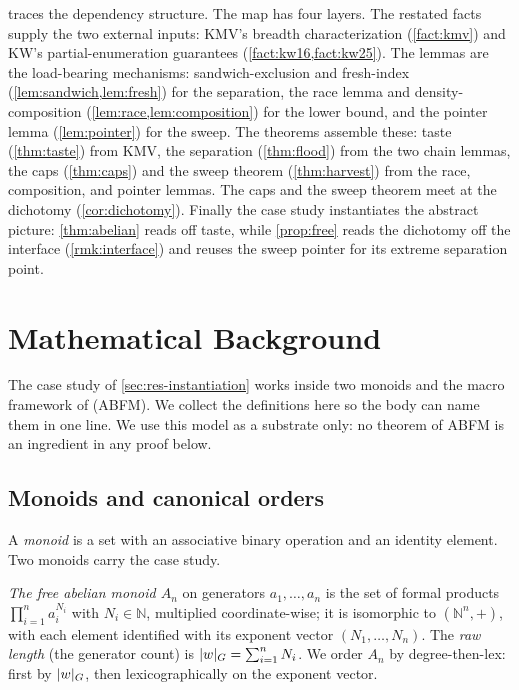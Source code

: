 \documentclass[11pt]{article}
\numberwithin{equation}{section}
\newcommand{\N}{\mathbb{N}}
\DeclarePairedDelimiter{\abs}{\lvert}{\rvert}
\theoremstyle{plain}
\theoremstyle{definition}
\theoremstyle{remark}
\begin{document}
\begin{figure}[omitted: a diagram of this paper's results, not reproduced here]\label{fig:map}\end{figure}
 traces the dependency structure. The map has four layers. The restated facts
supply the two external inputs: KMV's breadth characterization (\cref{fact:kmv}) and KW's
partial-enumeration guarantees (\cref{fact:kw16,fact:kw25}). The lemmas are the load-bearing
mechanisms: sandwich-exclusion and fresh-index (\cref{lem:sandwich,lem:fresh}) for the
separation, the race lemma and density-composition (\cref{lem:race,lem:composition}) for the
lower bound, and the pointer lemma (\cref{lem:pointer}) for the sweep. The theorems assemble
these: taste (\cref{thm:taste}) from KMV, the separation (\cref{thm:flood}) from the two chain
lemmas, the caps (\cref{thm:caps}) and the sweep theorem (\cref{thm:harvest}) from the race,
composition, and pointer lemmas. The caps and the sweep theorem meet at the dichotomy
(\cref{cor:dichotomy}). Finally the case study instantiates the abstract picture:
\cref{thm:abelian} reads off taste, while \cref{prop:free} reads the dichotomy off the
interface (\cref{rmk:interface}) and reuses the sweep pointer for its extreme separation
point.

\section{Mathematical Background}
\label{app:background}

The case study of \cref{sec:res-instantiation} works inside two monoids and the macro
framework of \citet{aksenov2026compression} (ABFM). We collect the definitions here so the
body can name them in one line. We use this model as a substrate only: no theorem of ABFM is
an ingredient in any proof below.

\subsection{Monoids and canonical orders}
\label{app:bg-monoids}

A \emph{monoid} is a set with an associative binary operation and an identity element. Two
monoids carry the case study.

\emph{The free abelian monoid $A_n$} on generators $a_1, \dots, a_n$ is the set of formal
products $\prod_{i=1}^n a_i^{N_i}$ with $N_i \in \N$, multiplied coordinate-wise; it is
isomorphic to $(\N^n, +)$, with each element identified with its exponent vector $(N_1, \dots,
N_n)$. The \emph{raw length} (the generator count) is $\abs{w}_G = \sum_{i=1}^n N_i$. We order
$A_n$ by degree-then-lex: first by $\abs{w}_G$, then lexicographically on the exponent vector.
\end{document}
